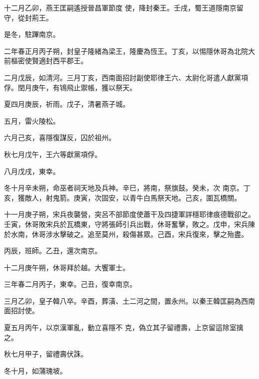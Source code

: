 \begin{pinyinscope}
 十二月乙卯，燕王匡嗣遙授晉昌軍節度
 使，降封秦王。壬戌，蜀王道隱南京留守，從封荊王。



 是冬，駐蹕南京。



 二年春正月丙子朔，封皇子隆緒為梁王，隆慶為恆王。丁亥，以惕隱休哥為北院大前樞密使賢適封西平郡王。



 二月戊辰，如清河。三月丁亥，西南面招討副使耶律王六、太尉化哥遣人獻黨項俘。閏月庚午，有鴇飛止禦帳，獲以祭天。



 夏四月庚辰，祈雨。戊子，清暑燕子城。



 五月，雷火陵松。



 六月己亥，喜隱復謀反，囚於祖州。



 秋七月戊午，王六等獻黨項俘。



 八月戊戌，東幸。



 冬十月辛未朔，命巫者祠天地及兵神。辛巳，將南，祭旗鼓。癸未，次
 南京。丁亥，獲敵人，射鬼箭。庚寅，次固安，以青牛白馬祭天地。己亥，圍瓦橋關。



 十一月庚子朔，宋兵夜襲營，突呂不部節度使蕭干及四捷軍詳穩耶律痕德戰卻之。壬寅，休哥敗宋兵於瓦橋東，守將張師引兵出戰，休哥奮擊，敗之。戊申，宋兵陳於水南，休哥涉水擊破之。追至莫州，殺傷甚眾。己酉，宋兵復來，擊之殆盡。



 丙辰，班師。乙丑，還次南京。



 十二月庚午朔，休哥拜於越。大饗軍士。



 三年春二月丙子，東幸。己丑，復幸南京。



 三月乙卯，皇子韓八卒。辛酉，葬潢、土二河之間，置永州。以秦王韓匡嗣為西南面招討使。



 夏五月丙午，以京漢軍亂，動立喜隱不
 克，偽立其子留禮壽，上京留這除室擒之。



 秋七月甲子，留禮壽伏誅。



 冬十月，如蒲瑰坡。




\end{pinyinscope}
